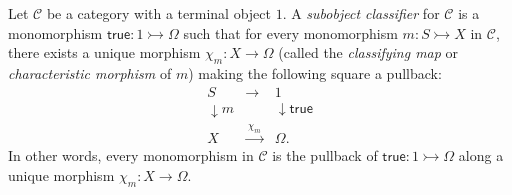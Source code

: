 Let $\mathcal{C}$ be a category with a terminal object $1$. A \textit{subobject classifier} for $\mathcal{C}$ is a monomorphism $\mathsf{true} : 1 \rightarrowtail \Omega$ such that for every monomorphism $m : S \rightarrowtail X$ in $\mathcal{C}$, there exists a unique morphism $\chi_m : X \to \Omega$ (called the \textit{classifying map} or \textit{characteristic morphism} of $m$) making the following square a pullback:
$$
\begin{array}{ccc}
S & \longrightarrow & 1 \\[4pt]
\downarrow\scriptstyle{m} & & \downarrow\scriptstyle{\mathsf{true}} \\[4pt]
X & \xrightarrow{\;\chi_m\;} & \Omega.
\end{array}
$$
In other words, every monomorphism in $\mathcal{C}$ is the pullback of $\mathsf{true} : 1 \rightarrowtail \Omega$ along a unique morphism $\chi_m : X \to \Omega$.
